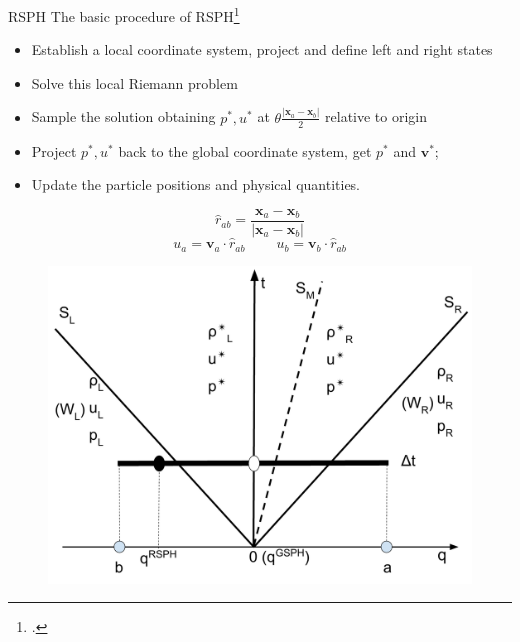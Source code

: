 \documentclass{beamer}
\begin{document}
\begin{frame}{RSPH}
The basic procedure of RSPH\footcite{zhixuan2018rcm}\\
\begin{minipage}{0.45\textwidth}
\begin{itemize}
\item Establish a local coordinate system, project and define left and right states
\item Solve this local Riemann problem 
\item Sample the solution obtaining $p^{\ast}, u^{\ast}$ at $\theta \frac{|\textbf{x}_{a} - \textbf{x}_{ b}|}{2}$ relative to origin
\item Project $p^{\ast}, u^{\ast}$  back to the global coordinate system, get $p^{\ast}$ and $\textbf{v}^{\ast}$;
\item Update the particle positions and physical quantities.
\end{itemize}
\end{minipage}
\begin{minipage}{.54 \textwidth}
\begin{equation}
\hat{r}_{a b}= \frac{\textbf{x}_{a} - \textbf{x}_{ b}}{|\textbf{x}_{a} - \textbf{x}_{ b}|}
\end{equation}
\begin{equation}
u_{a}= \textbf{v}_{a} \cdot \hat{r}_{a b}
~~~~~~~~~~
u_{b}= \textbf{v}_{b} \cdot \hat{r}_{a b}
\label{eq:RP-project-2-local}
\end{equation}
\begin{figure}
    \center
	\includegraphics[width=0.85 \textwidth]{./Chapter-4/Figures/RSPH-GSPH}
    \label{fig:pick-up-state-GSPH-RSPH}
\end{figure}

\end{minipage}
\end{frame}
\end{document}
